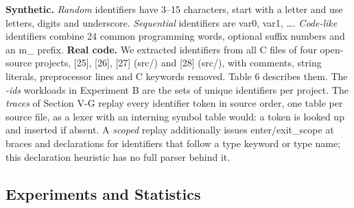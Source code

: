 \documentclass{ieeeaccess}
\begin{document}
\textbf{Synthetic.} \emph{Random} identifiers have 3--15 characters, start with a letter and use letters, digits and underscore. \emph{Sequential} identifiers are var0, var1, \ldots{}. \emph{Code-like} identifiers combine 24 common programming words, optional suffix numbers and an m\_ prefix. \textbf{Real code.} We extracted identifiers from all C files of four open-source projects, [25], [26], [27] (src/) and [28] (src/), with comments, string literals, preprocessor lines and C keywords removed. Table 6 describes them. The \emph{-ids} workloads in Experiment B are the sets of unique identifiers per project. The \emph{traces} of Section V-G replay every identifier token in source order, one table per source file, as a lexer with an interning symbol table would: a token is looked up and inserted if absent. A \emph{scoped} replay additionally issues enter/exit\_scope at braces and declarations for identifiers that follow a type keyword or type name; this declaration heuristic has no full parser behind it.

\begin{table}[!t]
\caption{Real-code workloads (identifier counts after removing comments, strings, directives and keywords).}
\label{tab:6}
\centering
\scriptsize
{}
\end{table}


\subsection{Experiments and Statistics}
\end{document}
